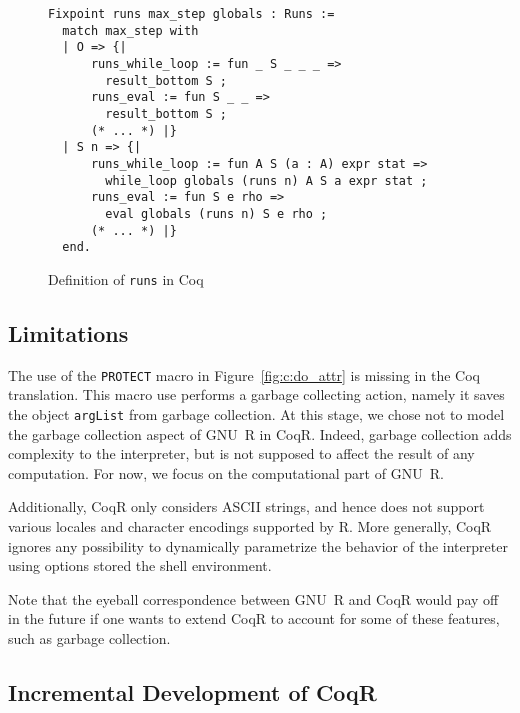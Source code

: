 \documentclass[
    sigplan,
    10pt,
    review, %
    natbib=false %
 ]{acmart}
\newcommand\mb[1]{\todo[color=purple!20,size=\scriptsize]{#1}}
\newcommand\CoqR{CoqR}
\begin{document}
\begin{figure}
\begin{verbatim}
Fixpoint runs max_step globals : Runs :=
  match max_step with
  | O => {|
      runs_while_loop := fun _ S _ _ _ =>
        result_bottom S ;
      runs_eval := fun S _ _ =>
        result_bottom S ;
      (* ... *) |}
  | S n => {|
      runs_while_loop := fun A S (a : A) expr stat =>
        while_loop globals (runs n) A S a expr stat ;
      runs_eval := fun S e rho =>
        eval globals (runs n) S e rho ;
      (* ... *) |}
  end.
\end{verbatim}
\vspace{-1em}
    \caption{Definition of \texttt{runs} in Coq}
    \label{fig:runs}
\end{figure}


\subsection{Limitations}
The use of the \texttt{PROTECT} macro in Figure~\ref{fig:c:do_attr} is missing in the Coq translation. This macro use performs a garbage collecting action, namely it saves the object \texttt{argList} from garbage collection.
At this stage, we chose not to model the garbage collection aspect of GNU~R in \CoqR{}. Indeed, garbage collection adds complexity to the interpreter, but is not supposed to affect the result of any computation. For now, we focus on the computational part of GNU~R.

Additionally, \CoqR{} only considers ASCII strings, and hence does not support various locales and character encodings supported by R.
More generally, \CoqR{} ignores any possibility to dynamically
parametrize the behavior of the interpreter using options
stored the shell environment.


Note that the eyeball correspondence between GNU~R and \CoqR{} would pay off in the future if one wants to extend \CoqR{} to account for some of these features, such as garbage collection.



\subsection{Incremental Development of \CoqR{}}
\label{sec:coq:structure}
\end{document}
